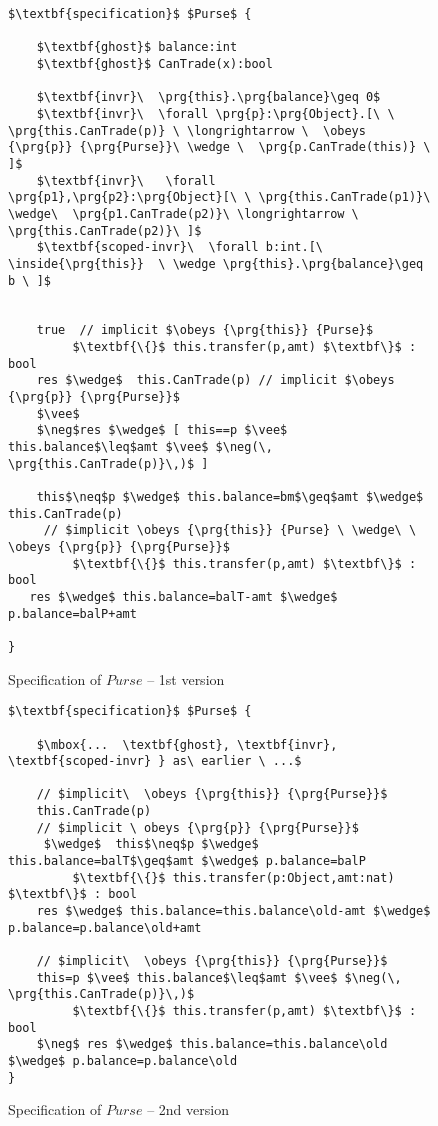 \begin{figure*}[t]
\begin{lstlisting}[mathescape=true, language=Chainmail, frame=lines]
$\textbf{specification}$ $Purse$ {
    
    $\textbf{ghost}$ balance:int
    $\textbf{ghost}$ CanTrade(x):bool  
         
    $\textbf{invr}\  \prg{this}.\prg{balance}\geq 0$  
    $\textbf{invr}\  \forall \prg{p}:\prg{Object}.[\ \ \prg{this.CanTrade(p)} \ \longrightarrow \  \obeys {\prg{p}} {\prg{Purse}}\ \wedge \  \prg{p.CanTrade(this)} \  ]$
    $\textbf{invr}\   \forall \prg{p1},\prg{p2}:\prg{Object}[\ \ \prg{this.CanTrade(p1)}\ \wedge\  \prg{p1.CanTrade(p2)}\ \longrightarrow \  \prg{this.CanTrade(p2)}\ ]$  
    $\textbf{scoped-invr}\  \forall b:int.[\ \inside{\prg{this}}  \ \wedge \prg{this}.\prg{balance}\geq b \ ]$
     
     
    true  // implicit $\obeys {\prg{this}} {Purse}$
         $\textbf{\{}$ this.transfer(p,amt) $\textbf\}$ : bool
    res $\wedge$  this.CanTrade(p) // implicit $\obeys {\prg{p}} {\prg{Purse}}$
    $\vee$
    $\neg$res $\wedge$ [ this==p $\vee$ this.balance$\leq$amt $\vee$ $\neg(\, \prg{this.CanTrade(p)}\,)$ ]

    this$\neq$p $\wedge$ this.balance=bm$\geq$amt $\wedge$  this.CanTrade(p)  
     // $implicit \obeys {\prg{this}} {Purse} \ \wedge\ \    \obeys {\prg{p}} {\prg{Purse}}$
         $\textbf{\{}$ this.transfer(p,amt) $\textbf\}$ : bool
   res $\wedge$ this.balance=balT-amt $\wedge$ p.balance=balP+amt 

}

\end{lstlisting}
\caption{Specification of  $Purse$ -- 1st version}
\label{fig:PurseSpec}
 \end{figure*}
 
 
 \begin{figure*}[t]
\begin{lstlisting}[mathescape=true, language=Chainmail, frame=lines]
$\textbf{specification}$ $Purse$ {
    
    $\mbox{...  \textbf{ghost}, \textbf{invr}, \textbf{scoped-invr} } as\ earlier \ ...$
     
    // $implicit\  \obeys {\prg{this}} {\prg{Purse}}$
    this.CanTrade(p) 
    // $implicit \ obeys {\prg{p}} {\prg{Purse}}$
     $\wedge$  this$\neq$p $\wedge$ this.balance=balT$\geq$amt $\wedge$ p.balance=balP
         $\textbf{\{}$ this.transfer(p:Object,amt:nat) $\textbf\}$ : bool
    res $\wedge$ this.balance=this.balance\old-amt $\wedge$ p.balance=p.balance\old+amt 

    // $implicit\  \obeys {\prg{this}} {\prg{Purse}}$
    this=p $\vee$ this.balance$\leq$amt $\vee$ $\neg(\, \prg{this.CanTrade(p)}\,)$  
         $\textbf{\{}$ this.transfer(p,amt) $\textbf\}$ : bool
    $\neg$ res $\wedge$ this.balance=this.balance\old $\wedge$ p.balance=p.balance\old
}

\end{lstlisting}
\caption{Specification of  $Purse$ -- 2nd version}
\label{fig:PurseSpec:two}
 \end{figure*}
 
